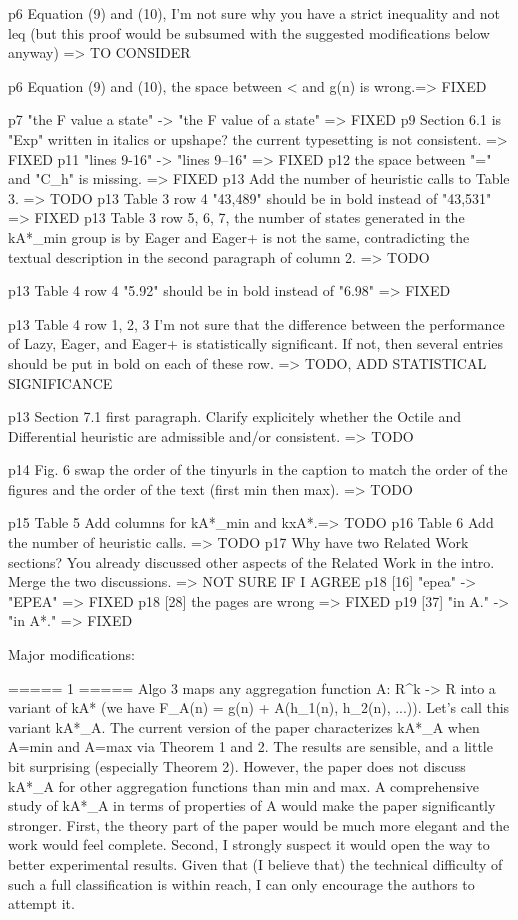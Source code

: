 p6 Equation (9) and (10), I'm not sure why you have a strict
inequality and not leq (but this proof would be subsumed with the
suggested modifications below anyway) => TO CONSIDER

p6 Equation (9) and (10), the space between < and g(n) is wrong.=> FIXED

p7 "the F value a state" -> "the F value of a state" => FIXED
p9 Section 6.1 is "Exp" written in italics or upshape? the
current typesetting is not consistent. => FIXED
p11 "lines 9-16" -> "lines 9--16" => FIXED
p12 the space between "=" and "C_h" is missing. => FIXED
p13 Add the number of heuristic calls to Table 3. => TODO
p13 Table 3 row 4 "43,489" should be in bold instead of
"43,531" => FIXED
p13 Table 3 row 5, 6, 7, the number of states generated in the kA*_min
group is by Eager and Eager+ is not the same, contradicting the
textual description in the second paragraph of column 2. => TODO

p13 Table 4 row 4 "5.92" should be in bold instead of "6.98" => FIXED

p13 Table 4 row 1, 2, 3 I'm not sure that the difference between the
performance of Lazy, Eager, and Eager+ is statistically significant.
If not, then several entries should be put in bold on each of these
row. => TODO, ADD STATISTICAL SIGNIFICANCE

p13 Section 7.1 first paragraph. Clarify explicitely whether the
Octile and Differential heuristic are admissible and/or consistent. => TODO

p14 Fig. 6 swap the order of the tinyurls in the caption to match the
order of the figures and the order of the text (first min then max). => TODO

p15 Table 5 Add columns for kA*_min and kxA*.=> TODO
p16 Table 6 Add the number of heuristic calls. => TODO
p17 Why have two Related Work sections? You already discussed other aspects of the Related Work in the intro. Merge the two discussions. => NOT SURE IF I AGREE
p18 [16] "epea" -> "EPEA" => FIXED
p18 [28] the pages are wrong  => FIXED
p19 [37] "in A." -> "in A*."  => FIXED


Major modifications:

===== 1 =====
Algo 3 maps any aggregation function A: R^k -> R into a variant of
kA* (we have F_A(n) = g(n) + A(h_1(n), h_2(n), ...)). Let's call this
variant kA*_A. The current version of the paper characterizes kA*_A
when A=min and A=max via Theorem 1 and 2. The results are sensible,
and a little bit surprising (especially Theorem 2). However, the paper
does not discuss kA*_A for other aggregation functions than min and
max. A comprehensive study of kA*_A in terms of properties of A would
make the paper significantly stronger. First, the theory part of the
paper would be much more elegant and the work would feel complete.
Second, I strongly suspect it would open the way to better
experimental results. Given that (I believe that) the technical
difficulty of such a full classification is within reach, I can only
encourage the authors to attempt it.

